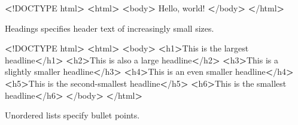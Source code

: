 \documentclass[]{book}
\newenvironment{Shaded}{\begin{snugshade}}{\end{snugshade}}
\newcommand{\ExtensionTok}[1]{#1}
\newcommand{\NormalTok}[1]{#1}
\newcommand{\OperatorTok}[1]{\textcolor[rgb]{0.81,0.36,0.00}{\textbf{#1}}}
\begin{document}
\begin{Shaded}
\begin{Highlighting}[]
\OperatorTok{<}\NormalTok{!}\ExtensionTok{DOCTYPE}\NormalTok{ html}\OperatorTok{>}         
\OperatorTok{<}\ExtensionTok{html}\OperatorTok{>}                  
    \OperatorTok{<}\ExtensionTok{body}\OperatorTok{>}              
        \ExtensionTok{Hello}\NormalTok{, world!   }
    \OperatorTok{<}\NormalTok{/}\ExtensionTok{body}\OperatorTok{>}             
\OperatorTok{<}\NormalTok{/}\ExtensionTok{html}\OperatorTok{>}                 
\end{Highlighting}
\end{Shaded}

Headings specifies header text of increasingly small sizes.

\begin{Shaded}
\begin{Highlighting}[]
\OperatorTok{<}\NormalTok{!}\ExtensionTok{DOCTYPE}\NormalTok{ html}\OperatorTok{>}         
\OperatorTok{<}\ExtensionTok{html}\OperatorTok{>}                  
    \OperatorTok{<}\ExtensionTok{body}\OperatorTok{>}              
        \OperatorTok{<}\ExtensionTok{h1}\OperatorTok{>}\NormalTok{This is the largest headline}\OperatorTok{<}\NormalTok{/h1}\OperatorTok{>}        
        \OperatorTok{<}\ExtensionTok{h2}\OperatorTok{>}\NormalTok{This is also a large headline}\OperatorTok{<}\NormalTok{/h2}\OperatorTok{>}       
        \OperatorTok{<}\ExtensionTok{h3}\OperatorTok{>}\NormalTok{This is a slightly smaller headline}\OperatorTok{<}\NormalTok{/h3}\OperatorTok{>} 
        \OperatorTok{<}\ExtensionTok{h4}\OperatorTok{>}\NormalTok{This is an even smaller headline}\OperatorTok{<}\NormalTok{/h4}\OperatorTok{>}    
        \OperatorTok{<}\ExtensionTok{h5}\OperatorTok{>}\NormalTok{This is the second-smallest headline}\OperatorTok{<}\NormalTok{/h5}\OperatorTok{>}
        \OperatorTok{<}\ExtensionTok{h6}\OperatorTok{>}\NormalTok{This is the smallest headline}\OperatorTok{<}\NormalTok{/h6}\OperatorTok{>}       
    \OperatorTok{<}\NormalTok{/}\ExtensionTok{body}\OperatorTok{>}             
\OperatorTok{<}\NormalTok{/}\ExtensionTok{html}\OperatorTok{>}                 
\end{Highlighting}
\end{Shaded}

Unordered lists specify bullet points.
\end{document}
